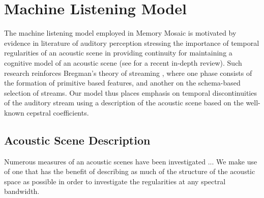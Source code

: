 \documentclass[a4paper,10pt,final]{ThesisStyle}
\begin{document}





\section{Machine Listening Model}
\label{sec:machine-listening-model}

The machine listening model employed in Memory Mosaic is motivated by evidence in  literature of auditory perception stressing the importance of temporal regularities of an acoustic scene in providing continuity for maintaining a cognitive model of an acoustic scene (see \cite{Winkler2009a} for a recent in-depth review).  Such research reinforces Bregman's theory of streaming \cite{Bregman1990}, where one phase consists of the formation of primitive based features, and another on the schema-based selection of streams.  Our model thus places emphasis on temporal discontinuities of the auditory stream using a description of the acoustic scene based on the well-known cepstral coefficients.  %

\subsection{Acoustic Scene Description}
\label{subsec:acoustic-scene-description}

Numerous measures of an acoustic scenes have been investigated ...  We make use of one that has the benefit of describing as much of the structure of the acoustic space as possible in order to investigate the regularities at any spectral bandwidth.  
\end{document}
